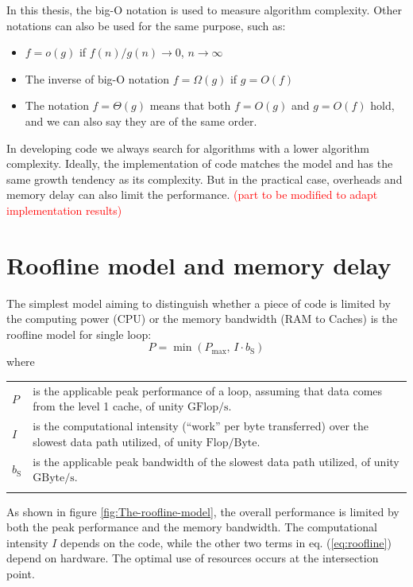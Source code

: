 In this thesis, the big-O notation is used to measure algorithm complexity.
Other notations can also be used for the same purpose, such as:
\begin{itemize}
\item $f=o(g)$ if $f(n)/g(n)\rightarrow0$, $n\rightarrow\infty$
\item The inverse of big-O notation $f=\Omega(g)$ if $g=O(f)$
\item The notation $f=\Theta(g)$ means that both $f=O(g)$ and $g=O(f)$
hold, and we can also say they are of the same order.
\end{itemize}
In developing code we always search for algorithms with a lower algorithm complexity.
Ideally, the implementation of code matches the model and has the
same growth tendency as its complexity. But in the practical case,
overheads and memory delay can also limit the performance. \textcolor{red}{(part
to be modified to adapt implementation results)}

\section{Roofline model and memory delay}

The simplest model aiming to distinguish whether a piece of code is
limited by the computing power (CPU) or the memory bandwidth (RAM
to Caches) is the roofline model \citep{Williams_2009_roofline} for
single loop:
\begin{equation}
P=\min\left(P_{\max},\,I\cdot b_{\mathrm{S}}\right)\label{eq:roofline}
\end{equation}
where

\begin{tabular}{l>{\raggedright}p{}}
$P$ & is the applicable peak performance of a loop, assuming that data comes
from the level 1 cache, of unity $\mathrm{GFlop/s}$. \tabularnewline
$I$ & is the computational intensity (“work” per byte transferred) over
the slowest data path utilized, of unity $\mathrm{Flop/Byte}$. \tabularnewline
$b_{\mathrm{S}}$ & is the applicable peak bandwidth of the slowest data path utilized,
of unity $\mathrm{GByte/s}$.\tabularnewline
 & \tabularnewline
\end{tabular}

As shown in figure \ref{fig:The-roofline-model}, the overall performance
is limited by both the peak performance and the memory bandwidth.
The computational intensity $I$ depends on the code, while the other
two terms in eq. (\ref{eq:roofline}) depend on hardware. The optimal
use of resources occurs at the intersection point.


